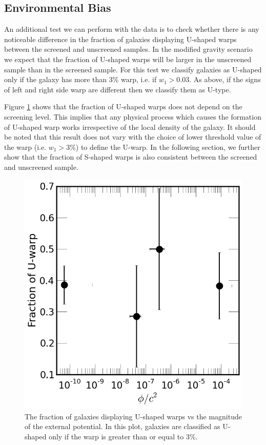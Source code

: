 \documentclass[twocolappendix, numberedappendix]{emulateapj}
\begin{document}
\subsection{Environmental Bias}
An additional test we can perform with the data is to check whether there is
any noticeable difference in the fraction of galaxies displaying
U-shaped warps between the screened and unscreened samples.
In the modified gravity scenario we expect
that the fraction of U-shaped warps will be larger in the unscreened sample
than in the screened sample. For this test we classify galaxies as U-shaped
only if the galaxy has more than 3\% warp, i.e. if
$w_1 > 0.03$. As above, if the signs of left and right side warp
are different then we classify them as U-type.

Figure \ref{fig:warp-stren-frac} shows that the fraction of U-shaped
warps does not depend on the screening level. This implies that any
physical process which causes the formation of
U-shaped warp works irrespective of the local
density of the galaxy. It should be noted that this result does not vary with
the choice of lower threshold value of the warp (i.e. $w_1 > 3$\%) to define
the U-warp.  In the following section, we further show that the fraction
of S-shaped warps is also consistent between the screened and unscreened
sample.


\begin{figure}
\begin{center}
\includegraphics[scale=0.35]{figures/warp-frac-vs-environ.png}
\caption{The fraction of galaxies displaying U-shaped warps
  vs the magnitude of the external potential. In this plot, galaxies are classified as U-shaped only
  if the warp is greater than or equal to 3\%.}
\label{fig:warp-stren-frac}
\end{center}
\end{figure}
\end{document}
